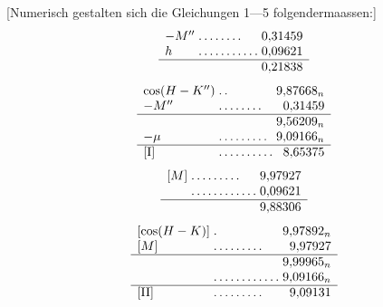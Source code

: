 [Numerisch gestalten sich die Gleichungen 1—5 folgendermaassen:]
\[
\begin{array}{l@{\;}l@{\;}r}
-M''&\mathord{.}\,\mathord{.}\,\mathord{.}\,\mathord{.}\,\mathord{.}\,\mathord{.}\,\mathord{.}\,\mathord{.}&0{,}31459\\
h&\mathord{.}\,\mathord{.}\,\mathord{.}\,\mathord{.}\,\mathord{.}\,\mathord{.}\,\mathord{.}\,\mathord{.}\,\mathord{.}\,\mathord{.}\,\mathord{.}&0{,}09621\\\hline
&&0{,}21838
\end{array}
\]
\[
\begin{array}{l@{\;}l@{\;}r}
\cos(H-K'')&\mathord{.}\,\mathord{.}&9{,}87668_n\\
-M''&\mathord{.}\,\mathord{.}\,\mathord{.}\,\mathord{.}\,\mathord{.}\,\mathord{.}\,\mathord{.}\,\mathord{.}&0{,}31459\\\hline
&&9{,}56209_n\\
-\mu&\mathord{.}\,\mathord{.}\,\mathord{.}\,\mathord{.}\,\mathord{.}\,\mathord{.}\,\mathord{.}\,\mathord{.}\,\mathord{.}&9{,}09166_n\\\hline
[\mathrm{I}]&\mathord{.}\,\mathord{.}\,\mathord{.}\,\mathord{.}\,\mathord{.}\,\mathord{.}\,\mathord{.}\,\mathord{.}\,\mathord{.}\,\mathord{.}&8{,}65375
\end{array}
\]
\[
\begin{array}{l@{\;}l@{\;}r}
[M]&\mathord{.}\,\mathord{.}\,\mathord{.}\,\mathord{.}\,\mathord{.}\,\mathord{.}\,\mathord{.}\,\mathord{.}\,\mathord{.}&9{,}97927\\
&\mathord{.}\,\mathord{.}\,\mathord{.}\,\mathord{.}\,\mathord{.}\,\mathord{.}\,\mathord{.}\,\mathord{.}\,\mathord{.}\,\mathord{.}\,\mathord{.}\,\mathord{.}&0{,}09621\\\hline
&&9{,}88306
\end{array}
\]
\[
\begin{array}{l@{\;}l@{\;}r}
[\cos(H-K)]&\mathord{.}&9{,}97892_n\\
{}[M]&\mathord{.}\,\mathord{.}\,\mathord{.}\,\mathord{.}\,\mathord{.}\,\mathord{.}\,\mathord{.}\,\mathord{.}\,\mathord{.}&9{,}97927\\\hline
&&9{,}99965_n\\
&\mathord{.}\,\mathord{.}\,\mathord{.}\,\mathord{.}\,\mathord{.}\,\mathord{.}\,\mathord{.}\,\mathord{.}\,\mathord{.}\,\mathord{.}\,\mathord{.}\,\mathord{.}&9{,}09166_n\\\hline
[\mathrm{II}]&\mathord{.}\,\mathord{.}\,\mathord{.}\,\mathord{.}\,\mathord{.}\,\mathord{.}\,\mathord{.}\,\mathord{.}\,\mathord{.}&9{,}09131
\end{array}
\]

